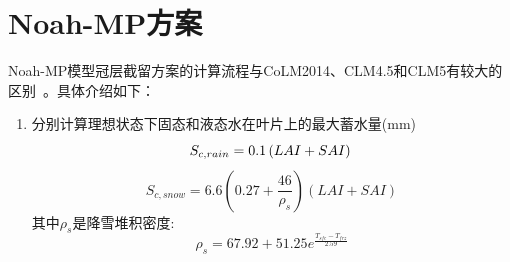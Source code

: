 \section{Noah-MP方案}
Noah-MP模型冠层截留方案的计算流程与CoLM2014、CLM4.5和CLM5有较大的区别~\citep{niu2011community,he2023modernizing}。具体介绍如下：
\begin{enumerate}
\item 分别计算理想状态下固态和液态水在叶片上的最大蓄水量(mm)\\
\begin{equation}
S_{c,rain}=0.1\left(LAI+SAI\right)\\
\end{equation}
\begin{equation}
S_{c,snow}= 6.6\left(0.27+{\frac{46}{\rho_{s}}}\right) \left(LAI+SAI\right)
\end{equation}
其中$\rho_{s}$是降雪堆积密度: 
\begin{equation}
\rho_{s}=67.92+51.25 e^{\frac{T_{sfc}-T_{frz}}{2.59}}
\end{equation}


\end{enumerate}

